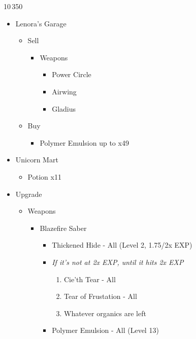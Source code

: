 \documentclass{report}
\begin{document}
\begin{shop}{10\,350}
\begin{itemize}
    \item Lenora's Garage
    \begin{itemize}
        \item Sell
        \begin{itemize}
            \item Weapons
            \begin{itemize}
                \item Power Circle
                \item Airwing
                \item Gladius
            \end{itemize}
        \end{itemize}
        \item Buy
        \begin{itemize}
            \item Polymer Emulsion up to x49
        \end{itemize}
    \end{itemize}
    \item Unicorn Mart
    \begin{itemize}
        \item Potion x11
    \end{itemize}
\end{itemize}
\end{shop}
\begin{upgrade}
\begin{itemize}
    \item Upgrade
    \begin{itemize}
        \item Weapons
        \begin{itemize}
            \item Blazefire Saber
            \begin{itemize}
                \item Thickened Hide - All (Level 2, 1.75/2x EXP)
                \item \textit{If it's not at 2x EXP, until it hits 2x EXP}
                \begin{enumerate}
                    \item Cie'th Tear - All
                    \item Tear of Frustation - All
                    \item Whatever organics are left
                \end{enumerate}
                \item Polymer Emulsion - All (Level 13)
            \end{itemize}
        \end{itemize}
    \end{itemize}
\end{itemize}
\end{upgrade}
\end{document}
